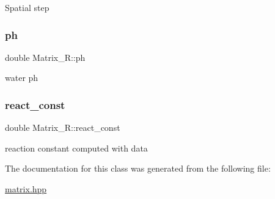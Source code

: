 Spatial step \mbox{\label{classMatrix__R_ae8345433c06d0d0249c09783c4ff80bc}} 
\subsubsection{\texorpdfstring{ph}{ph}}
{\footnotesize\ttfamily double Matrix\+\_\+\+R\+::ph\hspace{0.3cm}{\ttfamily [private]}}

water ph \mbox{\label{classMatrix__R_af2872298a4ebd9ac7493a1f55e3fa586}} 
\subsubsection{\texorpdfstring{react\+\_\+const}{react\_const}}
{\footnotesize\ttfamily double Matrix\+\_\+\+R\+::react\+\_\+const\hspace{0.3cm}{\ttfamily [private]}}

reaction constant computed with data 

The documentation for this class was generated from the following file\+:\begin{DoxyCompactItemize}
\item 
\hyperlink{matrix_8hpp}{matrix.\+hpp}\end{DoxyCompactItemize}

